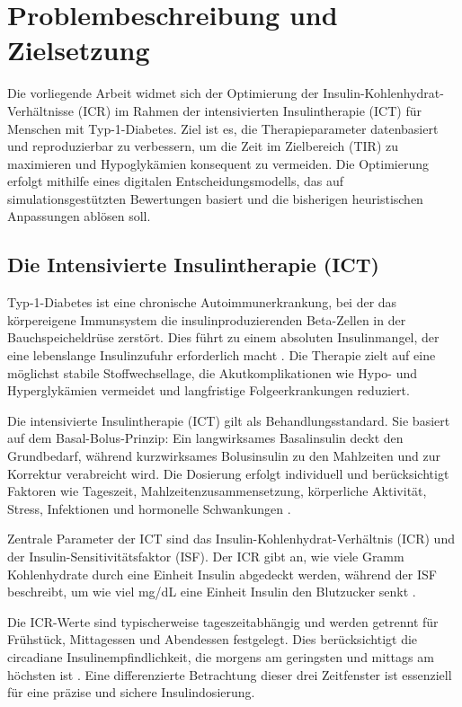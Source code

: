 \section{Problembeschreibung und Zielsetzung}

Die vorliegende Arbeit widmet sich der Optimierung der Insulin-Kohlenhydrat-Verhältnisse (ICR) im Rahmen der intensivierten Insulintherapie (ICT) für Menschen mit Typ-1-Diabetes. Ziel ist es, die Therapieparameter datenbasiert und reproduzierbar zu verbessern, um die Zeit im Zielbereich (TIR) zu maximieren und Hypoglykämien konsequent zu vermeiden. Die Optimierung erfolgt mithilfe eines digitalen Entscheidungsmodells, das auf simulationsgestützten Bewertungen basiert und die bisherigen heuristischen Anpassungen ablösen soll.

\subsection{Die Intensivierte Insulintherapie (ICT)}

Typ-1-Diabetes ist eine chronische Autoimmunerkrankung, bei der das körpereigene Immunsystem die insulinproduzierenden Beta-Zellen in der Bauchspeicheldrüse zerstört. Dies führt zu einem absoluten Insulinmangel, der eine lebenslange Insulinzufuhr erforderlich macht \cite{ddg2023}. Die Therapie zielt auf eine möglichst stabile Stoffwechsellage, die Akutkomplikationen wie Hypo- und Hyperglykämien vermeidet und langfristige Folgeerkrankungen reduziert.

Die intensivierte Insulintherapie (ICT) gilt als Behandlungsstandard. Sie basiert auf dem Basal-Bolus-Prinzip: Ein langwirksames Basalinsulin deckt den Grundbedarf, während kurzwirksames Bolusinsulin zu den Mahlzeiten und zur Korrektur verabreicht wird. Die Dosierung erfolgt individuell und berücksichtigt Faktoren wie Tageszeit, Mahlzeitenzusammensetzung, körperliche Aktivität, Stress, Infektionen und hormonelle Schwankungen \cite{ddg2023}.

Zentrale Parameter der ICT sind das Insulin-Kohlenhydrat-Verhältnis (ICR) und der Insulin-Sensitivitätsfaktor (ISF). Der ICR gibt an, wie viele Gramm Kohlenhydrate durch eine Einheit Insulin abgedeckt werden, während der ISF beschreibt, um wie viel mg/dL eine Einheit Insulin den Blutzucker senkt \cite{davidson2008analysis}.

Die ICR-Werte sind typischerweise tageszeitabhängig und werden getrennt für Frühstück, Mittagessen und Abendessen festgelegt. Dies berücksichtigt die circadiane Insulinempfindlichkeit, die morgens am geringsten und mittags am höchsten ist \cite{ddg2023}. Eine differenzierte Betrachtung dieser drei Zeitfenster ist essenziell für eine präzise und sichere Insulindosierung.

